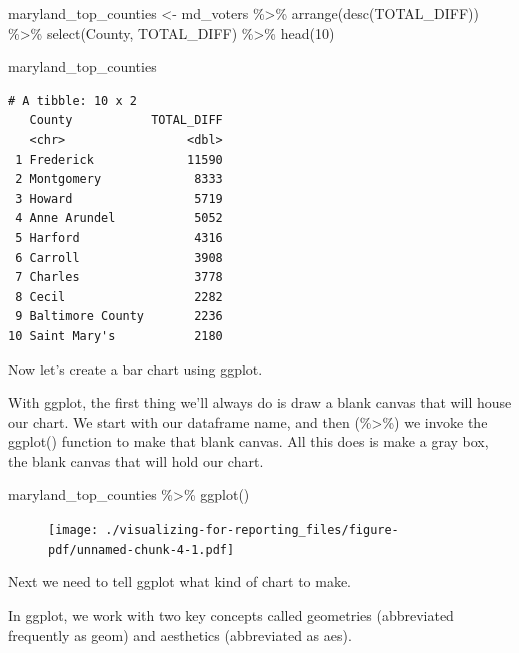 \documentclass[
  letterpaper,
  DIV=11,
  numbers=noendperiod]{scrreprt}
\newenvironment{Shaded}{\begin{snugshade}}{\end{snugshade}}
\newcommand{\DecValTok}[1]{\textcolor[rgb]{0.68,0.00,0.00}{#1}}
\newcommand{\FunctionTok}[1]{\textcolor[rgb]{0.28,0.35,0.67}{#1}}
\newcommand{\NormalTok}[1]{\textcolor[rgb]{0.00,0.23,0.31}{#1}}
\newcommand{\OtherTok}[1]{\textcolor[rgb]{0.00,0.23,0.31}{#1}}
\newcommand{\SpecialCharTok}[1]{\textcolor[rgb]{0.37,0.37,0.37}{#1}}
\begin{document}
\begin{Shaded}
\begin{Highlighting}[]
\NormalTok{maryland\_top\_counties }\OtherTok{\textless{}{-}}\NormalTok{ md\_voters }\SpecialCharTok{\%\textgreater{}\%}
  \FunctionTok{arrange}\NormalTok{(}\FunctionTok{desc}\NormalTok{(TOTAL\_DIFF)) }\SpecialCharTok{\%\textgreater{}\%}
  \FunctionTok{select}\NormalTok{(County, TOTAL\_DIFF) }\SpecialCharTok{\%\textgreater{}\%} 
  \FunctionTok{head}\NormalTok{(}\DecValTok{10}\NormalTok{)}

\NormalTok{maryland\_top\_counties}
\end{Highlighting}
\end{Shaded}

\begin{verbatim}
# A tibble: 10 x 2
   County           TOTAL_DIFF
   <chr>                 <dbl>
 1 Frederick             11590
 2 Montgomery             8333
 3 Howard                 5719
 4 Anne Arundel           5052
 5 Harford                4316
 6 Carroll                3908
 7 Charles                3778
 8 Cecil                  2282
 9 Baltimore County       2236
10 Saint Mary's           2180
\end{verbatim}

Now let's create a bar chart using ggplot.

With ggplot, the first thing we'll always do is draw a blank canvas that
will house our chart. We start with our dataframe name, and then
(\%\textgreater\%) we invoke the ggplot() function to make that blank
canvas. All this does is make a gray box, the blank canvas that will
hold our chart.

\begin{Shaded}
\begin{Highlighting}[]
\NormalTok{maryland\_top\_counties }\SpecialCharTok{\%\textgreater{}\%}
  \FunctionTok{ggplot}\NormalTok{()}
\end{Highlighting}
\end{Shaded}

\begin{figure}[H]

{\centering \texttt{[image: ./visualizing-for-reporting\_files/figure-pdf/unnamed-chunk-4-1.pdf]}

}

\end{figure}

Next we need to tell ggplot what kind of chart to make.

In ggplot, we work with two key concepts called geometries (abbreviated
frequently as geom) and aesthetics (abbreviated as aes).
\end{document}
